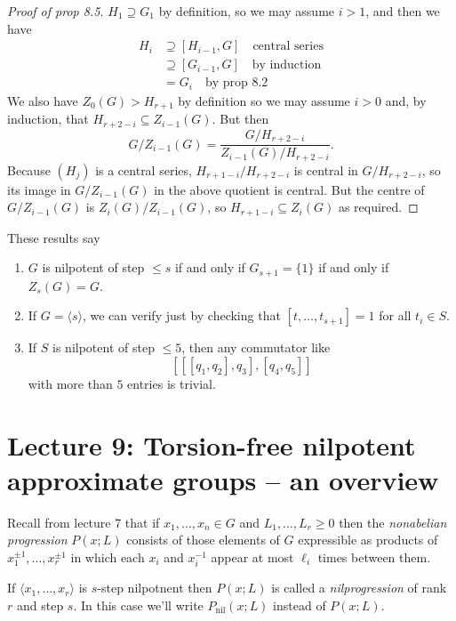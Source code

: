 \documentclass[a4paper]{article}
\begin{document}
\begin{proof}[Proof of prop 8.5]
  \(H_1 \supseteq G_1\) by definition, so we may assume \(i > 1\), and then we have
  \begin{align*}
    H_i
    &\supseteq [H_{i - 1}, G] \quad \text{central series} \\
    &\supseteq [G_{i - 1}, G] \quad \text{by induction} \\
    &= G_i \quad \text{by prop 8.2}
  \end{align*}
  We also have \(Z_0(G) > H_{r + 1}\) by definition so we may assume \(i > 0\) and, by induction, that \(H_{r + 2 - i} \subseteq Z_{i - 1}(G)\). But then
  \[
    G/Z_{i - 1}(G) = \frac{G/H_{r + 2 - i}}{Z_{i - 1}(G)/H_{r + 2 - i}}.
  \]
  Because \((H_j)\) is a central series, \(H_{r + 1 - i}/H_{r + 2 - i}\) is central in \(G/H_{r + 2 - i}\), so its image in \(G/Z_{i - 1}(G)\) in the above quotient is central. But the centre of \(G/Z_{i - 1}(G)\)  is \(Z_i(G)/Z_{i - 1}(G)\), so \(H_{r + 1 -i} \subseteq Z_i(G)\) as required.
\end{proof}

These results say
\begin{enumerate}
\item \(G\) is nilpotent of step \(\leq s\) if and only if \(G_{s + 1} = \{1\}\) if and only if \(Z_s(G) = G\).
\item If \(G = \langle s \rangle\), we can verify just by checking that \([t, \dots, t_{s + 1}] = 1\) for all \(t_i \in S\).
\item If \(S\) is nilpotent of step \(\leq 5\), then any commutator like
  \[
    [[[q_1, q_2], q_3], [q_4, q_5]]
  \]
  with more than \(5\) entries is trivial.
\end{enumerate}

\section*{Lecture 9: Torsion-free nilpotent approximate groups -- an overview}

Recall from lecture 7 that if \(x_1, \dots, x_n \in G\) and \(L_1, \dots, L_r \geq 0\) then the \emph{nonabelian progression} \(P(x; L)\) consists of those elements of \(G\) expressible as products of \(x_1^{\pm 1}, \dots, x_r^{\pm 1}\) in which each \(x_i\) and \(x_i^{-1}\) appear at most \(\ell_i\) times between them.

\begin{definition}[nilprogression]
  If \(\langle x_1, \dots, x_r \rangle\) is \(s\)-step nilpotnent then \(P(x; L)\) is called a \emph{nilprogression} of rank \(r\) and step \(s\). In this case we'll write \(P_{\text{nil}}(x; L)\) instead of \(P(x; L)\).
\end{definition}
\end{document}
